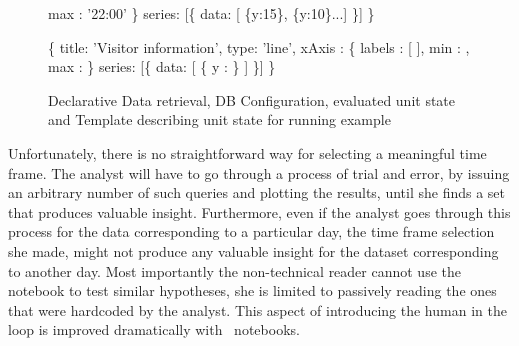 \begin{figure}[hbt!]
\begin{minipage}[c]{6cm}
\begin{minipage}[c]{7.5cm}
\begin{code}
       max : '22:00'
     \}
     series: [\{ data: [ \{y:15\}, \{y:10\}...] \}]
   \} 
 \end{code}
 \vspace*{-0.4cm}
 \vspace*{0.3cm}
 \label{figure:running-example:unit-body}
 \end{minipage}
 \begin{minipage}[c]{7.5cm}
 \begin{code}
    \{
     title: 'Visitor information',
     type: 'line',
     xAxis : \{ 
       labels : [
         ],
       min : ,
       max : 
     \}
     series: [\{
       data: [ 
           \{
             y  : 
           \}
          ]
     \}]
   \} 
 \end{code}
 \vspace*{-0.3cm}
 \vspace*{0cm}
 \label{figure:first-running-example:main-template}
 \end{minipage}
 \end{minipage}
 \vspace*{-0.3cm}
 \caption{Declarative Data retrieval, DB Configuration, evaluated unit state and Template describing unit state for running example}
 \vspace*{-0.3cm}
 \end{figure}
 Unfortunately, there is no straightforward way for selecting a meaningful time frame. The analyst will have to go through a process of trial and error, by issuing an arbitrary number of such queries and plotting the results, until she finds a set that produces valuable insight. Furthermore, even if the analyst goes through this process for the data corresponding to a particular day, the time frame selection she made, might not produce any valuable insight for the dataset corresponding to another day. Most importantly the non-technical reader cannot use the notebook to test similar hypotheses, she is limited to passively reading the ones that were hardcoded by the analyst. This aspect of introducing the human in the loop is improved dramatically with \projname\ notebooks.
 


